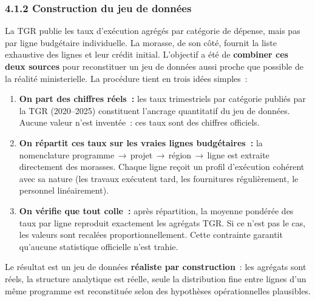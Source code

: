\subsubsection*{4.1.2 \quad Construction du jeu de donn\'ees}

La TGR publie les taux d'ex\'ecution agr\'eg\'es par cat\'egorie de d\'epense, mais
pas par ligne budg\'etaire individuelle. La morasse, de son c\^ot\'e, fournit la
liste exhaustive des lignes et leur cr\'edit initial. L'objectif a \'et\'e de
\textbf{combiner ces deux sources} pour reconstituer un jeu de donn\'ees aussi
proche que possible de la r\'ealit\'e ministerielle. La proc\'edure tient en
trois id\'ees simples~:

\begin{enumerate}
    \item \textbf{On part des chiffres r\'eels~:} les taux trimestriels par cat\'egorie
    publi\'es par la TGR (2020--2025) constituent l'ancrage quantitatif du jeu de
    donn\'ees. Aucune valeur n'est invent\'ee~: ces taux sont des chiffres officiels.

    \item \textbf{On r\'epartit ces taux sur les vraies lignes budg\'etaires~:} la
    nomenclature programme\,$\rightarrow$\,projet\,$\rightarrow$\,r\'egion\,$\rightarrow$\,ligne
    est extraite directement des morasses. Chaque ligne re\c{c}oit un profil
    d'ex\'ecution coh\'erent avec sa nature (les travaux ex\'ecutent tard, les
    fournitures r\'eguli\`erement, le personnel lin\'eairement).

    \item \textbf{On v\'erifie que tout colle~:} apr\`es r\'epartition, la moyenne
    pond\'er\'ee des taux par ligne reproduit exactement les agr\'egats TGR. Si ce
    n'est pas le cas, les valeurs sont recal\'ees proportionnellement. Cette
    contrainte garantit qu'aucune statistique officielle n'est trahie.
\end{enumerate}

Le r\'esultat est un jeu de donn\'ees \textbf{r\'ealiste par construction}~: les
agr\'egats sont r\'eels, la structure analytique est r\'eelle, seule la
distribution fine entre lignes d'un m\^eme programme est reconstitu\'ee selon
des hypoth\`eses op\'erationnelles plausibles.

